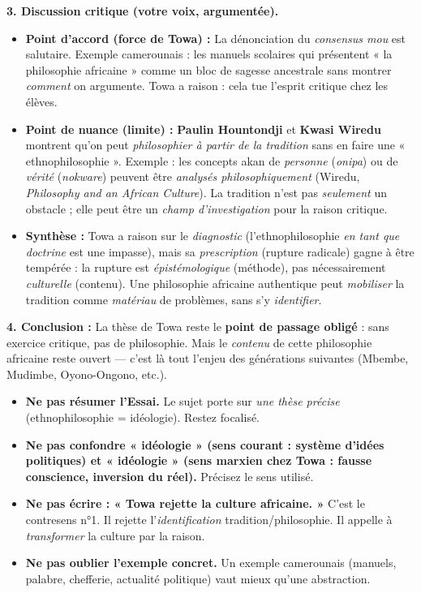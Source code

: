 \documentclass[11pt]{article}
\begin{document}
\begin{exoresolu}
\medskip
\noindent \textbf{3. Discussion critique (votre voix, argumentée).}
\begin{itemize}
\item \textbf{Point d'accord (force de Towa) :} La dénonciation du \emph{consensus mou} est salutaire. Exemple camerounais : les manuels scolaires qui présentent « la philosophie africaine » comme un bloc de sagesse ancestrale sans montrer \emph{comment} on argumente. Towa a raison : cela tue l'esprit critique chez les élèves.
\item \textbf{Point de nuance (limite) :} \textbf{Paulin Hountondji} et \textbf{Kwasi Wiredu} montrent qu'on peut \emph{philosophier à partir de la tradition} sans en faire une « ethnophilosophie ». Exemple : les concepts akan de \emph{personne} (\emph{onipa}) ou de \emph{vérité} (\emph{nokware}) peuvent être \emph{analysés philosophiquement} (Wiredu, \emph{Philosophy and an African Culture}). La tradition n'est pas \emph{seulement} un obstacle ; elle peut être un \emph{champ d'investigation} pour la raison critique.
\item \textbf{Synthèse :} Towa a raison sur le \emph{diagnostic} (l'ethnophilosophie \emph{en tant que doctrine} est une impasse), mais sa \emph{prescription} (rupture radicale) gagne à être tempérée : la rupture est \emph{épistémologique} (méthode), pas nécessairement \emph{culturelle} (contenu). Une philosophie africaine authentique peut \emph{mobiliser} la tradition comme \emph{matériau} de problèmes, sans s'y \emph{identifier}.
\end{itemize}

\medskip
\noindent \textbf{4. Conclusion :} La thèse de Towa reste le \textbf{point de passage obligé} : sans exercice critique, pas de philosophie. Mais le \emph{contenu} de cette philosophie africaine reste ouvert — c'est là tout l'enjeu des générations suivantes (Mbembe, Mudimbe, Oyono-Ongono, etc.).
\end{exoresolu}

\begin{attention}
\begin{itemize}
\item \textbf{Ne pas résumer l'Essai.} Le sujet porte sur \emph{une thèse précise} (ethnophilosophie = idéologie). Restez focalisé.
\item \textbf{Ne pas confondre « idéologie » (sens courant : système d'idées politiques) et « idéologie » (sens marxien chez Towa : fausse conscience, inversion du réel).} Précisez le sens utilisé.
\item \textbf{Ne pas écrire : « Towa rejette la culture africaine. »} C'est le contresens n°1. Il rejette l'\emph{identification} tradition/philosophie. Il appelle à \emph{transformer} la culture par la raison.
\item \textbf{Ne pas oublier l'exemple concret.} Un exemple camerounais (manuels, palabre, chefferie, actualité politique) vaut mieux qu'une abstraction.
\end{itemize}
\end{attention}
\end{document}
